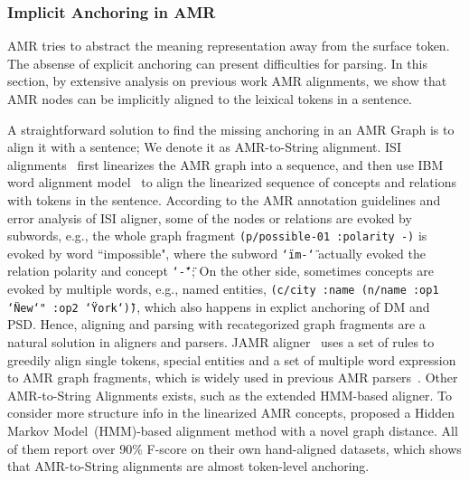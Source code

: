 \subsubsection{Implicit Anchoring in AMR}
\label{sssec:lex-phr:amr-anchor}
AMR tries to abstract the meaning representation away from the surface
token. The absense of explicit anchoring can present difficulties for
parsing. In this section, by extensive analysis on previous work AMR
alignments, we show that AMR nodes can be implicitly aligned to the
leixical tokens in a sentence.

 A straightforward solution to
find the missing anchoring in an AMR Graph is to align it with a
sentence; We denote it as AMR-to-String alignment. ISI
alignments~\cite{Pourdamghani:2014aligning} first linearizes the AMR
graph into a sequence, and then use IBM word alignment
model~\cite{brown1993mathematics} to align the linearized sequence of
concepts and relations with tokens in the sentence. According to the
AMR annotation guidelines and error analysis of ISI aligner, some of
the nodes or relations are evoked by subwords, e.g., the whole graph
fragment \texttt{(p/possible-01 :polarity -)} is evoked by word
``impossible", where the subword \texttt{\char`\"im-\char`\"} actually
evoked the relation polarity and concept \texttt{\char`\"-\char`\"};
On the other side, sometimes concepts are evoked by multiple words,
e.g., named entities, \texttt{(c/city :name (n/name :op1
  \char`\"New\char`" :op2 \char`\"York\char`\"))}, which also happens
in explict anchoring of DM and PSD. Hence, aligning and parsing with
recategorized graph fragments are a natural solution in aligners and
parsers. JAMR aligner~\cite{Flanigan:2014vc} uses a set of rules to
greedily align single tokens, special entities and a set of multiple
word expression to AMR graph fragments, which is widely used in
previous AMR
parsers~\cite[\eg][]{Flanigan:2014vc,Wang:2015uo,Artzi:2009tb,Pust:2015ug,Peng:2015tj,Konstas:2017uj,Wang:2017vt}. Other
AMR-to-String Alignments exists, such as the extended HMM-based
aligner. To consider more structure info in the linearized AMR
concepts, \citet{Wang:2017vt} proposed a Hidden Markov
Model~(HMM)-based alignment method with a novel graph distance. All of
them report over 90\% F-score on their own hand-aligned datasets,
which shows that AMR-to-String alignments are almost token-level
anchoring.
%


